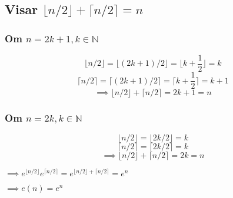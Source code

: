 \documentclass{article}
\begin{document}
\subsection{Visar ${\lfloor n/2 \rfloor}+{\lceil n/2 \rceil}=n$}
\subsubsection{Om $n=2k+1,k\in \mathbb{N}$}
$${\lfloor n/2 \rfloor}={\lfloor (2k+1)/2 \rfloor}={\lfloor k + \frac{1}{2} \rfloor}=k$$
$${\lceil n/2 \rceil}={\lceil(2k+1)/2 \rceil}={\lceil k + \frac{1}{2} \rceil}=k+1$$
$$\implies {\lfloor n/2 \rfloor}+{\lceil n/2 \rceil}=2k+1=n$$
 
\subsubsection{Om $n=2k,k\in \mathbb{N}$}
$${\lfloor n/2 \rfloor}={\lfloor 2k/2 \rfloor}=k$$
$${\lceil n/2 \rceil}={\lceil2k/2 \rceil}=k$$
$$\implies {\lfloor n/2 \rfloor}+{\lceil n/2 \rceil}=2k=n$$

$\implies e^{\lfloor n/2 \rfloor}e^{\lceil n/2 \rceil}=e^{\lfloor n/2 \rfloor + \lceil n/2 \rceil}=e^n$

$\implies e(n) = e^n$
\end{document}
